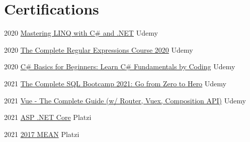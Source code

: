 \documentclass[letterpaper]{twentysecondcv} %
\begin{document}
\section{Certifications}
{
    \begin{twenty}
        
        
    
        
        
        \twentyitem
        {2020}
        {\href{http://ude.my/UC-cdbb0eb7-1152-42f4-883d-d267f2b7adf7}
            {Mastering LINQ with C\# and .NET}
        }
        {Udemy}
        {}
    
        \twentyitem
        {2020}
        {\href{http://ude.my/UC-c10e41d9-1c6f-44e5-9426-d4c40e385673}
            {The Complete Regular Expressions Course 2020}
        }
        {Udemy}
        {}
        
        \twentyitem
        {2020}
        {\href{http://ude.my/UC-d913aaf2-7f89-43bf-ab2d-a6d0192fd784}
            {C\# Basics for Beginners: Learn C\# Fundamentals by Coding}
        }
        {Udemy}
        {}
        
        \twentyitem
        {2021}
        {\href{http://ude.my/UC-a276cfba-5873-4f08-892b-ecd564b69cc7}
            {The Complete SQL Bootcamp 2021: Go from Zero to Hero}
        }
        {Udemy}
        {}
        
        \twentyitem
        {2021}
        {\href{http://ude.my/UC-6739b136-b8be-4568-ad89-7fd19bc0096d}
            {Vue - The Complete Guide (w/ Router, Vuex, Composition API)}}
        {Udemy}
        {}
        
        \twentyitem
        {2021}
        {\href{https://platzi.com/p/camurillo582/curso/1395-course/diploma/detalle}
            {ASP .NET Core}
        }
        {Platzi}
        {}
        
        \twentyitem
        {2021}
        {\href{https://platzi.com/p/camurillo582/curso/1182-mean-2017/diploma/detalle/}
            {2017 MEAN}
        }
        {Platzi}
        {}
        

\end{twenty}}
\end{document}
